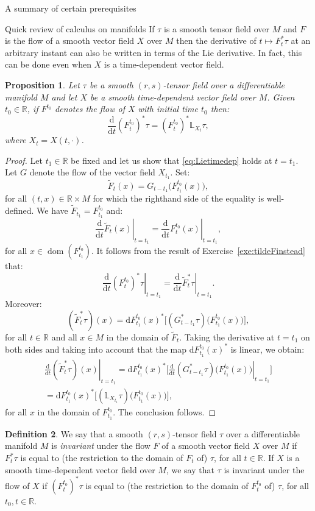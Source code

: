 \documentclass[oneside,a4paper,11pt]{amsbook}
\newcommand{\R}{\mathds R}
\newcommand{\dd}{\mathrm d}
\DeclareMathOperator{\Dom}{dom}
\theoremstyle{remark}\newtheorem{exercise}{Exercise}[chapter]
\theoremstyle{plain}\newtheorem{teo}{Theorem}[section]
\theoremstyle{plain}\newtheorem{lem}[teo]{Lemma}
\theoremstyle{plain}\newtheorem{prop}[teo]{Proposition}
\theoremstyle{plain}\newtheorem{cor}[teo]{Corollary}
\theoremstyle{definition}\newtheorem{defin}[teo]{Definition}
\theoremstyle{remark}\newtheorem{rem}[teo]{Remark}
\theoremstyle{definition}\newtheorem{notation}[teo]{Notation}
\theoremstyle{definition}\newtheorem{convention}[teo]{Convention}
\theoremstyle{definition}\newtheorem{example}[teo]{Example}
\numberwithin{section}{chapter}
\numberwithin{equation}{section}
\begin{document}
\begin{chapter}{A summary of certain prerequisites}
\begin{section}{Quick review of calculus on manifolds}
If $\tau$ is a smooth tensor field over $M$ and $F$ is the flow of a smooth vector field $X$ over $M$ then the derivative of $t\mapsto F_t^*\tau$ at an arbitrary
instant can also be written in terms of the Lie derivative. In fact, this can be done even when $X$ is a time-dependent vector field.
\begin{prop}
Let $\tau$ be a smooth $(r,s)$-tensor field over a differentiable manifold $M$ and let $X$ be a smooth
time-dependent vector field over $M$. Given $t_0\in\R$, if $F^{t_0}$ denotes the flow of $X$ with initial time $t_0$
then:
\begin{equation}\label{eq:Lietimedep}
\frac{\dd}{\dd t}(F^{t_0}_t)^*\tau=(F^{t_0}_t)^*\mathbb L_{X_t}\tau,
\end{equation}
where $X_t=X(t,\cdot)$.
\end{prop}
\begin{proof}
Let $t_1\in\R$ be fixed and let us show that \eqref{eq:Lietimedep} holds at $t=t_1$. Let $G$ denote the flow of
the vector field $X_{t_1}$. Set:
\[\widetilde F_t(x)=G_{t-t_1}\big(F^{t_0}_{t_1}(x)\big),\]
for all $(t,x)\in\R\times M$ for which the righthand side of the equality is well-defined. We have
$\widetilde F_{t_1}=F^{t_0}_{t_1}$ and:
\[\left.\frac{\dd}{\dd t}\widetilde F_t(x)\right\vert_{t=t_1}=\left.\frac{\dd}{\dd t}F^{t_0}_t(x)\right\vert_{t=t_1},\]
for all $x\in\Dom(F^{t_0}_{t_1})$. It follows from the result of Exercise~\ref{exe:tildeFinstead} that:
\[\left.\frac{\dd}{\dd t}(F^{t_0}_t)^*\tau\right\vert_{t=t_1}=
\left.\frac{\dd}{\dd t}\widetilde F_t^*\tau\right\vert_{t=t_1}.\]
Moreover:
\[(\widetilde F_t^*\tau)(x)=\dd F^{t_0}_{t_1}(x)^*\big[(G_{t-t_1}^*\tau)\big(F^{t_0}_{t_1}(x)\big)\big],\]
for all $t\in\R$ and all $x\in M$ in the domain of $\widetilde F_t$.
Taking the derivative at $t=t_1$ on both sides and taking into account that the map $\dd F^{t_0}_{t_1}(x)^*$ is linear,
we obtain:
\begin{multline*}
\left.\frac{\dd}{\dd t}(\widetilde F_t^*\tau)(x)\right\vert_{t=t_1}=
\dd F^{t_0}_{t_1}(x)^*\Big[\left.\frac{\dd}{\dd t}(G_{t-t_1}^*\tau)\big(F^{t_0}_{t_1}(x)\big)\right\vert_{t=t_1}\Big]\\
=\dd F^{t_0}_{t_1}(x)^*\big[(\mathbb L_{X_{t_1}}\tau)\big(F^{t_0}_{t_1}(x)\big)\big],
\end{multline*}
for all $x$ in the domain of $F^{t_0}_{t_1}$. The conclusion follows.
\end{proof}

\begin{defin}
We say that a smooth $(r,s)$-tensor field $\tau$ over a differentiable manifold $M$ is {\em invariant\/} under the
flow $F$ of a smooth vector field $X$ over $M$ if $F_t^*\tau$ is equal to (the restriction to the domain of $F_t$ of)
$\tau$, for all $t\in\R$. If $X$ is a smooth time-dependent vector field over $M$, we say that $\tau$ is invariant
under the flow of $X$ if $(F^{t_0}_t)^*\tau$ is equal to (the restriction to the domain of $F^{t_0}_t$ of) $\tau$,
for all $t_0,t\in\R$.
\end{defin}


\end{section}
\end{chapter}
\end{document}
